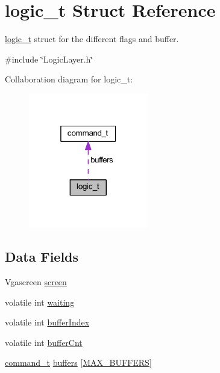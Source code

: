 \hypertarget{struct_l_l_1_1logic__t}{}\section{logic\+\_\+t Struct Reference}
\label{struct_l_l_1_1logic__t}


\mbox{\hyperlink{struct_l_l_1_1logic__t}{logic\+\_\+t}} struct for the different flags and buffer.  




{\ttfamily \#include \char`\"{}Logic\+Layer.\+h\char`\"{}}



Collaboration diagram for logic\+\_\+t\+:\nopagebreak
\begin{figure}[H]
\begin{center}
\leavevmode
\includegraphics[width=148pt]{struct_l_l_1_1logic__t__coll__graph}
\end{center}
\end{figure}
\subsection*{Data Fields}
\begin{DoxyCompactItemize}
\item 
Vgascreen \mbox{\hyperlink{struct_l_l_1_1logic__t_ac344c4d62de62802f8246dc20de6c21f}{screen}}
\item 
volatile int \mbox{\hyperlink{struct_l_l_1_1logic__t_a4ed52bbb2709b6819f5afc2641f6e768}{waiting}}
\item 
volatile int \mbox{\hyperlink{struct_l_l_1_1logic__t_a4b89a73e0fa3f732d2ad4bc0982f83f1}{buffer\+Index}}
\item 
volatile int \mbox{\hyperlink{struct_l_l_1_1logic__t_af3833538ae97a141cd1c33f92d0de926}{buffer\+Cnt}}
\item 
\mbox{\hyperlink{struct_l_l_1_1command__t}{command\+\_\+t}} \mbox{\hyperlink{struct_l_l_1_1logic__t_a09663354d4cddc7fc94fce6d60c2a9a2}{buffers}} \mbox{[}\mbox{\hyperlink{group___global_ga7781bc9613ec655352585fb1bac2595d}{M\+A\+X\+\_\+\+B\+U\+F\+F\+E\+RS}}\mbox{]}
\end{DoxyCompactItemize}


